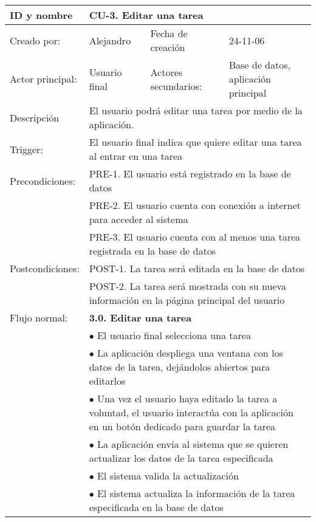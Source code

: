 \begin{longtable}[c]{p{3cm}p{5cm}p{4cm}p{2cm}}
  \endfirsthead
  \endhead
  \endfoot
  \hline
  ID y nombre & \multicolumn{3}{p{11cm}}{CU-3. Editar una tarea}\\
  \hline
  Creado por: & Alejandro & Fecha de creaci\'on & 24-11-06\\
  \hline
  Actor principal: & Usuario final & Actores secundarios: & Base de datos, aplicaci\'on principal\\
  \hline
  Descripci\'on & \multicolumn{3}{p{11cm}}{El usuario podr\'a editar una tarea por medio de la aplicaci\'on.}\\
  \hline
  Trigger: & \multicolumn{3}{p{11cm}}{El usuario final indica que quiere editar una tarea al entrar en una tarea}\\
  \hline
  Precondiciones: & \multicolumn{3}{p{11cm}}{PRE-1. El usuario est\'a registrado en la base de datos}\\
		  & \multicolumn{3}{p{11cm}}{PRE-2. El usuario cuenta con conexi\'on a internet para acceder al sistema}\\
		  & \multicolumn{3}{p{11cm}}{PRE-3. El usuario cuenta con al menos una tarea registrada en la base de datos}\\
  \hline
  Postcondiciones: & \multicolumn{3}{p{11cm}}{POST-1. La tarea ser\'a editada en la base de datos}\\
		   & \multicolumn{3}{p{11cm}}{POST-2. La tarea ser\'a mostrada con su nueva informaci\'on en la p\'agina principal del usuario}\\
  \hline
  Flujo normal: & \multicolumn{3}{p{11cm}}{\textbf{3.0. Editar una tarea}}\\
		& \multicolumn{3}{p{11cm}}{$\bullet$ El usuario final selecciona una tarea}\\
		& \multicolumn{3}{p{11cm}}{$\bullet$ La aplicaci\'on despliega una ventana con los datos de la tarea, dej\'andolos abiertos para editarlos}\\
		& \multicolumn{3}{p{11cm}}{$\bullet$ Una vez el usuario haya editado la tarea a voluntad, el usuario interact\'ua con la aplicaci\'on en un bot\'on dedicado para guardar la tarea}\\
		& \multicolumn{3}{p{11cm}}{$\bullet$ La aplicaci\'on env\'ia al sistema que se quieren actualizar los datos de la tarea especificada}\\
		& \multicolumn{3}{p{11cm}}{$\bullet$ El sistema valida la actualizaci\'on}\\
		& \multicolumn{3}{p{11cm}}{$\bullet$ El sistema actualiza la informaci\'on de la tarea especificada en la base de datos}\\

\end{longtable}
